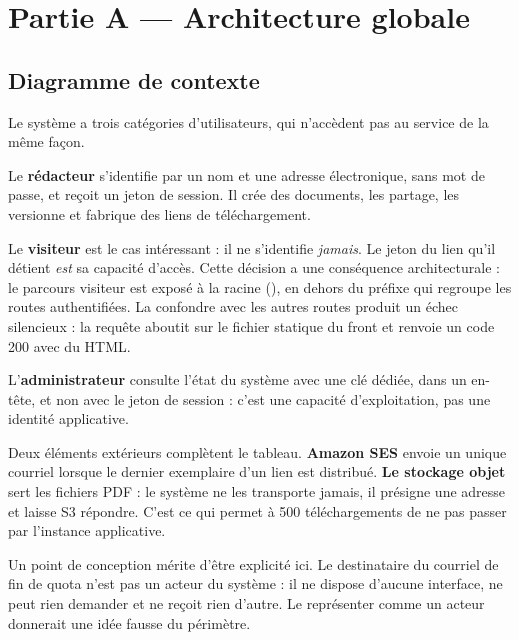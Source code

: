 \section{Partie A — Architecture globale}

\subsection{Diagramme de contexte}

Le système a trois catégories d'utilisateurs, qui n'accèdent pas au service de la
même façon.

Le \textbf{rédacteur} s'identifie par un nom et une adresse électronique, sans
mot de passe, et reçoit un jeton de session. Il crée des documents, les partage,
les versionne et fabrique des liens de téléchargement.

Le \textbf{visiteur} est le cas intéressant : il ne s'identifie \emph{jamais}.
Le jeton du lien qu'il détient \emph{est} sa capacité d'accès. Cette décision a
une conséquence architecturale : le parcours visiteur est exposé à la racine
(), en dehors du préfixe  qui regroupe les
routes authentifiées. La confondre avec les autres routes produit un échec
silencieux : la requête aboutit sur le fichier statique du front et renvoie un
code 200 avec du HTML.

L'\textbf{administrateur} consulte l'état du système avec une clé dédiée, dans
un en-tête, et non avec le jeton de session : c'est une capacité
d'exploitation, pas une identité applicative.

Deux éléments extérieurs complètent le tableau. \textbf{Amazon SES} envoie un
unique courriel lorsque le dernier exemplaire d'un lien est distribué.
\textbf{Le stockage objet} sert les fichiers PDF : le système ne les transporte
jamais, il présigne une adresse et laisse S3 répondre. C'est ce qui permet à
500 téléchargements de ne pas passer par l'instance applicative.


Un point de conception mérite d'être explicité ici. Le destinataire du courriel
de fin de quota n'est pas un acteur du système : il ne dispose d'aucune
interface, ne peut rien demander et ne reçoit rien d'autre. Le représenter comme
un acteur donnerait une idée fausse du périmètre.

